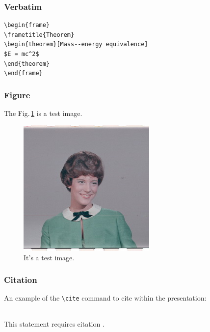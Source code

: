 \documentclass{beamer}
\begin{document}

\begin{frame}[fragile] %
\frametitle{Verbatim}
\begin{example}
\begin{verbatim}
\begin{frame}
\frametitle{Theorem}
\begin{theorem}[Mass--energy equivalence]
$E = mc^2$
\end{theorem}
\end{frame}\end{verbatim}
\end{example}
\end{frame}


\begin{frame}
\frametitle{Figure}
The Fig.\,\ref{fig:1} is a test image.
\begin{figure}
\includegraphics[width=0.5\linewidth]{test.jpg}
\caption{It's a test image.}
\label{fig:1}
\end{figure}
\end{frame}





\begin{frame}[fragile] %
\frametitle{Citation}
An example of the \verb|\cite| command to cite within the presentation:\\~

This statement requires citation \cite{p1}.
\end{frame}
\end{document}

